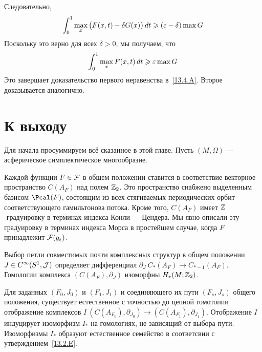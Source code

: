 Следовательно,
\[
\int_{0}^{1}\max_{x}\big(F(x,t)-\delta G(x)\big)\,d t
\geqslant
(\varepsilon-\delta)\max G
\]
Поскольку это верно для всех  $\delta > 0$, мы получаем, что
\[
\int_{0}^{1}\max_{x} F(x,t)\,d t
\geqslant
\varepsilon\max G
\]
Это завершает доказательство первого неравенства в~\ref{13.4.A}.
Второе доказывается аналогично.
\qeds

\section{К выходу}\label{13.5}

Для начала просуммируем всё сказанное в этой главе.
Пусть $(M,\Omega)$ — асферическое симплектическое многообразие.

\let\subsectionsave=\subsection
\makeatletter
\renewcommand{\subsection}{%
  \@startsection{subsection}%
  {2}%
  {0pt}%
  {1ex}%
  {0pt}%
  {\it}}
\makeatother
\def\thesubsection{\thesection.\Alph{subsection}}

\begin{ex}{}\label{13.5.A}
Каждой функции $F\in\mathcal{F}$ в общем положении ставится в соответствие
векторное пространство $C(A_{F})$ над полем $\mathbb{Z}_{2}$.
Это пространство снабжено выделенным базисом $\Pcal(F)$, состоящим из
всех стягиваемых периодических орбит соответствующего гамильтонова
потока. 
Кроме того, $C(A_{F})$ имеет $\mathbb{Z}$-градуировку в терминах индекса
Конли — Цендера. 
Мы явно описали эту градуировку в терминах индекса Морса в простейшем
случае, когда $F$ принадлежит $\mathcal{F}(g_{\varepsilon})$.
\end{ex}

\begin{ex}{}\label{13.5.B}
Выбор петли совместимых почти комплексных структур в общем положении
$J\in C^{\infty}(S^{1}, \mathcal{J})$ определяет дифференциал
$\partial_{J}\:C_{*}(A_{F})\to C_{*-1}(A_{F})$.
Гомологии комплекса $(C(A_{F}),\partial_{J})$ изоморфны
$H_{*}(M;\mathbb{Z}_{2})$. 
\end{ex}

\begin{ex}{}\label{13.5.C}
Для заданных $(F_{0},J_{0})$ и $(F_{1},J_{1})$ и соединяющего их пути
$(F_{s},J_{s})$ общего положения, существует естественное с точностью
до цепной гомотопии отображение 
комплексов $I\:(C(A_{F_{0}}),\partial_{J_{0}})\to(C(A_{F_{1}}),\partial_{J_{1}})$.
Отображение $I$ индуцирует изоморфизм $I_{*}$ на гомологиях, не
зависящий от выбора пути. 
Изоморфизмы $I_{*}$ образуют естественное
семейство в соответсвии с 
утверждением~\ref{13.2.E}. 
\end{ex}

